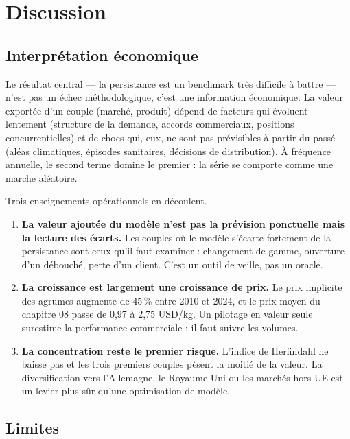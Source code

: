 \documentclass[11pt,a4paper]{article}
\begin{document}
\section{Discussion}\label{sec:discussion}

\subsection{Interprétation économique}

Le résultat central --- la persistance est un benchmark très difficile à battre
--- n'est pas un échec méthodologique, c'est une information économique. La
valeur exportée d'un couple (marché, produit) dépend de facteurs qui évoluent
lentement (structure de la demande, accords commerciaux, positions
concurrentielles) et de chocs qui, eux, ne sont pas prévisibles à partir du
passé (aléas climatiques, épisodes sanitaires, décisions de distribution). À
fréquence annuelle, le second terme domine le premier : la série se comporte
comme une marche aléatoire.

Trois enseignements opérationnels en découlent.

\begin{enumerate}[leftmargin=1.2cm]
\item \textbf{La valeur ajoutée du modèle n'est pas la prévision ponctuelle mais
la lecture des écarts.} Les couples où le modèle s'écarte fortement de la
persistance sont ceux qu'il faut examiner : changement de gamme, ouverture d'un
débouché, perte d'un client. C'est un outil de veille, pas un oracle.
\item \textbf{La croissance est largement une croissance de prix.} Le prix
implicite des agrumes augmente de 45\,\% entre 2010 et 2024, et le prix moyen
du chapitre 08 passe de 0,97 à 2,75 USD/kg. Un pilotage en valeur seule
surestime la performance commerciale ; il faut suivre les volumes.
\item \textbf{La concentration reste le premier risque.} L'indice de Herfindahl
ne baisse pas et les trois premiers couples pèsent la moitié de la valeur. La
diversification vers l'Allemagne, le Royaume-Uni ou les marchés hors UE est un
levier plus sûr qu'une optimisation de modèle.
\end{enumerate}

\subsection{Limites}
\end{document}
